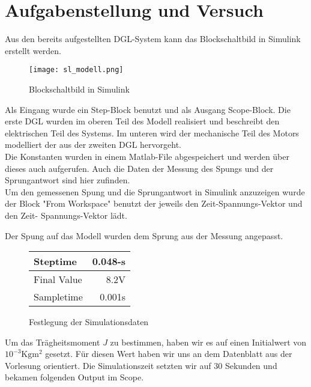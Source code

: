 \section{Aufgabenstellung und Versuch}

Aus den bereits aufgestellten DGL-System kann das Blockschaltbild in Simulink
erstellt werden.

\begin{figure}[H]
    \centering
    \texttt{[image: sl\_modell.png]}
    \caption{Blockschaltbild in Simulink}
    \label{fig:Blockschaltbild}
\end{figure}

Als Eingang wurde ein Step-Block benutzt und als Ausgang Scope-Block.
Die erste DGL wurden im oberen Teil des Modell realisiert und beschreibt
den elektrischen Teil des Systems. Im unteren wird der mechanische Teil
des Motors modelliert der aus der zweiten DGL hervorgeht.\\

Die Konstanten wurden in einem Matlab-File abgespeichert und werden über
dieses auch aufgerufen. Auch die Daten der Messung des Spungs und der
Sprungantwort sind hier zufinden.\\

Um den gemessenen Spung und die Sprungantwort in Simulink anzuzeigen wurde der Block
"From Workspace" benutzt der jeweils den Zeit-Spannungs-Vektor und den Zeit-
Spannungs-Vektor lädt.

Der Spung auf das Modell wurden dem Sprung aus der Messung angepasst.\\

\begin{figure}[H]
    \centering    
    \begin{tabular}[h]{l| r}
        Steptime & 0.048-s \\
        \hline
        Final Value & 8.2V \\
        \hline
        Sampletime & 0.001s \\
    \end{tabular}
    \caption{Festlegung der Simulationsdaten}
\end{figure}
    

Um das Trägheitsmoment $J$ zu bestimmen, haben wir es auf einen Initialwert
von $10^{-3}\mathrm{Kg m^2}$ gesetzt. Für diesen Wert haben wir uns an dem
Datenblatt aus der Vorlesung orientiert. Die Simulationszeit setzten wir auf
30 Sekunden und bekamen folgenden Output im Scope.



